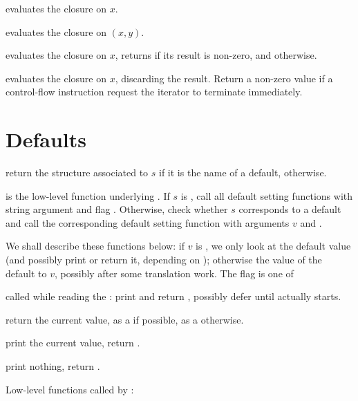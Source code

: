  evaluates the closure  on $x$.

 evaluates the closure 
on $(x,y)$.

 evaluates the closure  on
$x$, returns  if its result is non-zero, and  otherwise.

 evaluates the closure  on
$x$, discarding the result. Return a non-zero value if a control-flow
instruction request the iterator to terminate immediately.

\section{Defaults}

 return the 
structure associated to $s$ if it is the name of a default, 
otherwise.

 is the
low-level function underlying . If $s$ is , call all
default setting functions with string argument  and flag
. Otherwise, check whether $s$ corresponds to a default
and call the corresponding default setting function with arguments $v$ and
\fl.

We shall describe these functions below: if $v$ is , we only look
at the default value (and possibly print or return it, depending on
); otherwise the value of the default to $v$, possibly after some
translation work. The flag is one of

\item {} called while reading the : print and return
, possibly defer until  actually starts.

\item {} return the current value, as a  if possible, as
a  otherwise.

\item {} print the current value, return .

\item {} print nothing, return .

\noindent Low-level functions called by :



